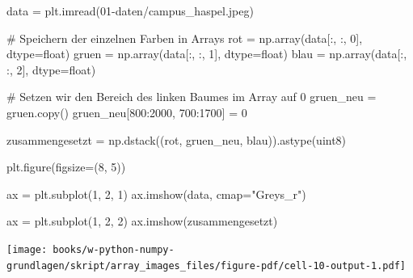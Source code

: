 \documentclass[
  letterpaper,
  DIV=11,
  numbers=noendperiod]{scrreprt}
\newenvironment{Shaded}{\begin{snugshade}}{\end{snugshade}}
\newcommand{\BuiltInTok}[1]{\textcolor[rgb]{0.00,0.23,0.31}{#1}}
\newcommand{\CommentTok}[1]{\textcolor[rgb]{0.37,0.37,0.37}{#1}}
\newcommand{\DecValTok}[1]{\textcolor[rgb]{0.68,0.00,0.00}{#1}}
\newcommand{\NormalTok}[1]{\textcolor[rgb]{0.00,0.23,0.31}{#1}}
\newcommand{\OperatorTok}[1]{\textcolor[rgb]{0.37,0.37,0.37}{#1}}
\newcommand{\StringTok}[1]{\textcolor[rgb]{0.13,0.47,0.30}{#1}}
\begin{document}
\begin{Shaded}
\begin{Highlighting}[]
\NormalTok{data }\OperatorTok{=}\NormalTok{ plt.imread(}\StringTok{\textquotesingle{}01{-}daten/campus\_haspel.jpeg\textquotesingle{}}\NormalTok{)}

\CommentTok{\# Speichern der einzelnen Farben in Arrays}
\NormalTok{rot }\OperatorTok{=}\NormalTok{ np.array(data[:, :, }\DecValTok{0}\NormalTok{], dtype}\OperatorTok{=}\BuiltInTok{float}\NormalTok{)}
\NormalTok{gruen }\OperatorTok{=}\NormalTok{ np.array(data[:, :, }\DecValTok{1}\NormalTok{], dtype}\OperatorTok{=}\BuiltInTok{float}\NormalTok{)}
\NormalTok{blau }\OperatorTok{=}\NormalTok{ np.array(data[:, :, }\DecValTok{2}\NormalTok{], dtype}\OperatorTok{=}\BuiltInTok{float}\NormalTok{)}

\CommentTok{\# Setzen wir den Bereich des linken Baumes im Array auf 0}
\NormalTok{gruen\_neu }\OperatorTok{=}\NormalTok{ gruen.copy()}
\NormalTok{gruen\_neu[}\DecValTok{800}\NormalTok{:}\DecValTok{2000}\NormalTok{, }\DecValTok{700}\NormalTok{:}\DecValTok{1700}\NormalTok{] }\OperatorTok{=} \DecValTok{0}

\NormalTok{zusammengesetzt }\OperatorTok{=}\NormalTok{ np.dstack((rot, gruen\_neu, blau)).astype(}\StringTok{\textquotesingle{}uint8\textquotesingle{}}\NormalTok{)}

\NormalTok{plt.figure(figsize}\OperatorTok{=}\NormalTok{(}\DecValTok{8}\NormalTok{, }\DecValTok{5}\NormalTok{))}

\NormalTok{ax }\OperatorTok{=}\NormalTok{ plt.subplot(}\DecValTok{1}\NormalTok{, }\DecValTok{2}\NormalTok{, }\DecValTok{1}\NormalTok{)}
\NormalTok{ax.imshow(data, cmap}\OperatorTok{=}\StringTok{"Greys\_r"}\NormalTok{)}

\NormalTok{ax }\OperatorTok{=}\NormalTok{ plt.subplot(}\DecValTok{1}\NormalTok{, }\DecValTok{2}\NormalTok{, }\DecValTok{2}\NormalTok{)}
\NormalTok{ax.imshow(zusammengesetzt)}
\end{Highlighting}
\end{Shaded}

\texttt{[image: books/w-python-numpy-grundlagen/skript/array\_images\_files/figure-pdf/cell-10-output-1.pdf]}
\end{document}

